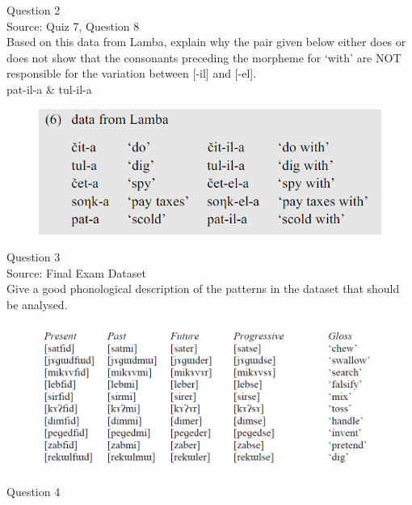 \documentclass[12pt]{article}
\begin{document}
\newpage

{\large Question 2}\\

Source: Quiz 7, Question 8\\

Based on this data from Lamba, explain why the pair given below either does or does not show that the consonants preceding the morpheme for `with' are NOT responsible for the variation between [-il] and [-el].\\

pat-il-a \& tul-il-a

\begin{figure}[H]
\includegraphics{../images/peng119_lamba.png}
\end{figure}

\newpage

{\large Question 3}\\

Source: Final Exam Dataset\\

Give a good phonological description of the patterns in the dataset that should be analysed.\\

\begin{figure}[H]
\includegraphics{../images/final_dataset.png}
\end{figure}

\newpage

{\large Question 4}\\
\end{document}
